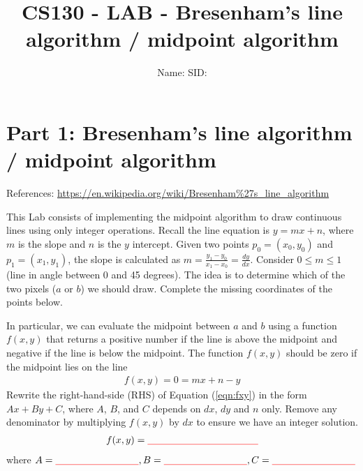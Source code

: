 \documentclass[12pt]{article}
\newcommand{\TODOL}[1]{\textcolor{red}{\underline{\hspace{#1 cm}}}}
\begin{document}
\title{CS130 - LAB - Bresenham's line algorithm / midpoint algorithm}
\date{}
\author{Name: \TODOL7\qquad\qquad SID: \TODOL4}
\maketitle
\begin{center}
\end{center}

\section*{Part 1: Bresenham's line algorithm / midpoint algorithm}

References: \href{https://en.wikipedia.org/wiki/Bresenham%27s_line_algorithm}{https://en.wikipedia.org/wiki/Bresenham\%27s\_line\_algorithm}

This Lab consists of implementing the midpoint algorithm to draw continuous
lines using only integer operations. Recall the line equation is $y = mx + n$,
where $m$ is the slope and $n$ is the $y$ intercept.  Given two points $p_0 =
(x_0, y_0)$ and $p_1 = (x_1, y_1)$, the slope is calculated as $m = \frac{y_1 -
  y_0}{x_1 - x_0} = \frac{dy}{dx}$.  Consider $0 \le m \le 1$ (line in angle
between 0 and 45 degrees).  The idea is to determine which of the two pixels
($a$ or $b$) we should draw. Complete the missing coordinates of the points
below.\\
\begin{center}
\end{center}

In particular, we can evaluate the midpoint between $a$ and $b$ using a function
$f(x,y)$ that returns a positive number if the line is above the midpoint and
negative if the line is below the midpoint.  The function $f(x,y)$ should be
zero if the midpoint lies on the line
\begin{align}\label{eqn:fxy}
f(x, y) = 0 = mx + n - y
\end{align}
Rewrite the right-hand-side (RHS) of Equation (\ref{eqn:fxy}) in the form $Ax +
By + C$, where $A$, $B$, and $C$ depends on $dx$, $dy$ and $n$ only. Remove any
denominator by multiplying $f(x, y)$ by $dx$ to ensure we have an integer
solution.
\begin{align}\label{eqn:fxy2}
  f(x, y) = \TODOL4
\end{align}
where $A = \TODOL3, B = \TODOL3, C = \TODOL3$
\end{document}
